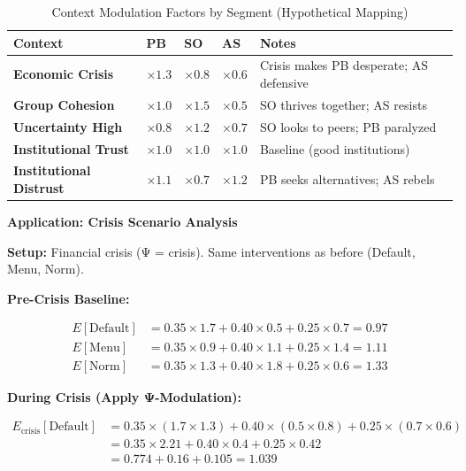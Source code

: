 \begin{table}[htbp]
\centering
\caption{Context Modulation Factors by Segment (Hypothetical Mapping)}
\label{tab:19-context-modulation}
\renewcommand{\arraystretch}{1.3}
\small
\begin{tabular}{@{}lllll@{}}
\toprule
\textbf{Context} & \textbf{PB} & \textbf{SO} & \textbf{AS} & \textbf{Notes} \\
\midrule
\textbf{Economic Crisis} & $\times 1.3$ & $\times 0.8$ & $\times 0.6$ & Crisis makes PB desperate; AS defensive \\
\textbf{Group Cohesion} & $\times 1.0$ & $\times 1.5$ & $\times 0.5$ & SO thrives together; AS resists \\
\textbf{Uncertainty High} & $\times 0.8$ & $\times 1.2$ & $\times 0.7$ & SO looks to peers; PB paralyzed \\
\textbf{Institutional Trust} & $\times 1.0$ & $\times 1.0$ & $\times 1.0$ & Baseline (good institutions) \\
\textbf{Institutional Distrust} & $\times 1.1$ & $\times 0.7$ & $\times 1.2$ & PB seeks alternatives; AS rebels \\
\bottomrule
\end{tabular}
\end{table}

\textbf{Application: Crisis Scenario Analysis}

\textbf{Setup:} Financial crisis (Ψ = crisis). Same interventions as before (Default, Menu, Norm).

\textbf{Pre-Crisis Baseline:}

\begin{equation}
\begin{aligned}
E[\text{Default}] &= 0.35 \times 1.7 + 0.40 \times 0.5 + 0.25 \times 0.7 = 0.97\\
E[\text{Menu}] &= 0.35 \times 0.9 + 0.40 \times 1.1 + 0.25 \times 1.4 = 1.11\\
E[\text{Norm}] &= 0.35 \times 1.3 + 0.40 \times 1.8 + 0.25 \times 0.6 = 1.33
\end{aligned}
\end{equation}

\textbf{During Crisis (Apply Ψ-Modulation):}

\begin{equation}
\begin{aligned}
E_{\text{crisis}}[\text{Default}] &= 0.35 \times (1.7 \times 1.3) + 0.40 \times (0.5 \times 0.8) + 0.25 \times (0.7 \times 0.6)\\
&= 0.35 \times 2.21 + 0.40 \times 0.4 + 0.25 \times 0.42\\
&= 0.774 + 0.16 + 0.105 = 1.039
\end{aligned}
\end{equation}

